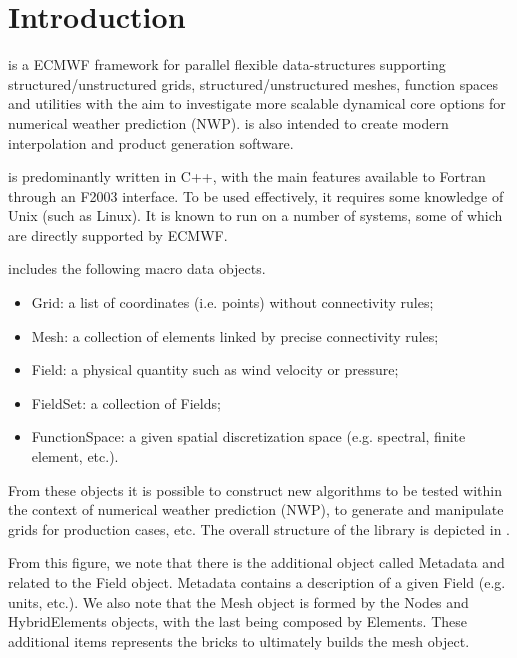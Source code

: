 \chapter{Introduction}
\Atlas is a ECMWF framework for parallel flexible data-structures 
supporting structured/unstructured grids, structured/unstructured 
meshes, function spaces and utilities with the aim to investigate 
more scalable dynamical core options for numerical weather prediction 
(NWP). \Atlas is also intended to create modern interpolation and 
product generation software.

\Atlas is predominantly written in C++, with the main features 
available to Fortran through an F2003 interface. To be used 
effectively, it requires some knowledge of Unix (such as Linux). 
It is known to run on a number of systems, some of which are 
directly supported by ECMWF.

\Atlas includes the following macro data objects.
%
\begin{itemize}
\item Grid: a list of coordinates (i.e. points) without connectivity rules;
\item Mesh: a collection of elements linked by precise connectivity rules;
\item Field: a physical quantity such as wind velocity or pressure;
\item FieldSet: a collection of Fields;
\item FunctionSpace: a given spatial discretization space (e.g. spectral, 
finite element, etc.).
\end{itemize}
%
From these objects it is possible to construct new algorithms 
to be tested within the context of numerical weather prediction 
(NWP), to generate and manipulate grids for production 
cases, etc. The overall structure of the library is depicted 
in .

From this figure, we note that there is the additional object 
called Metadata and related to the Field object. Metadata 
contains a description of a given Field (e.g. units, etc.).
We also note that the Mesh object is formed by the Nodes 
and HybridElements objects, with the last being composed 
by Elements. These additional items represents the bricks 
to ultimately builds the mesh object.
 
